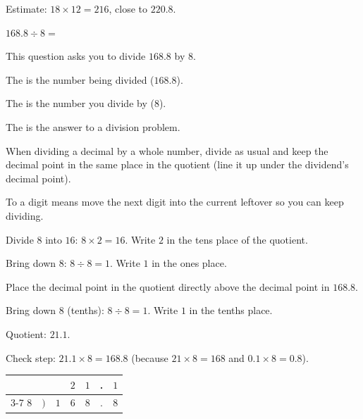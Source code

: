 
\noindent Estimate: $18 \times 12 = 216$, close to $220.8$.


\noindent $168.8 \div 8 = $\ansblank{}


\noindent This question asks you to divide $168.8$ by $8$.

\begin{words}
  \item The is the number being divided ($168.8$).
  \item The is the number you divide by ($8$).
  \item The is the answer to a division problem.
  \item When dividing a decimal by a whole number, divide as usual and keep the
        decimal point in the same place in the quotient (line it up under the
        dividend's decimal point).
  \item To a digit means move the next digit into the current
        leftover so you can keep dividing.
\end{words}

\begin{steps}
  \item Divide $8$ into $16$: $8 \times 2 = 16$. Write $2$ in the tens place of
        the quotient.
  \item Bring down $8$: $8 \div 8 = 1$. Write $1$ in the ones place.
  \item Place the decimal point in the quotient directly above the decimal point
        in $168.8$.
  \item Bring down $8$ (tenths): $8 \div 8 = 1$. Write $1$ in the tenths place.
  \item Quotient: $21.1$.
  \item Check step: $21.1 \times 8 = 168.8$ (because $21 \times 8 = 168$ and
        $0.1 \times 8 = 0.8$).
\end{steps}

\begin{center}
{\setlength{\tabcolsep}{0.18em}%
\begin{tabular}{ccccccc}
      &     &     & $2$ & $1$ & .   & $1$ \\ \cline{3-7}
  $8$ & $)$ & $1$ & $6$ & $8$ & .   & $8$ \\
\end{tabular}}
\end{center}

